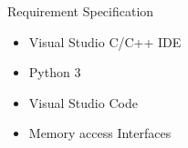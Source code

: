 \begin{frame}{Requirement Specification}
    \begin{itemize}
        \item Visual Studio C/C++ IDE
        \item Python 3
        \item Visual Studio Code
        \item Memory access Interfaces
    \end{itemize}
\end{frame}
